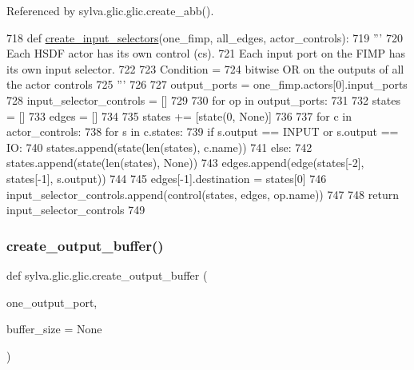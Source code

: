 Referenced by sylva.\+glic.\+glic.\+create\+\_\+abb().


\begin{DoxyCode}
718   \textcolor{keyword}{def }\hyperlink{namespacesylva_1_1glic_1_1glic_a28f028a55874a8d890d0df58905da73b}{create\_input\_selectors}(one\_fimp, all\_edges, actor\_controls):
719     \textcolor{stringliteral}{'''}
720 \textcolor{stringliteral}{      Each HSDF actor has its own control (cs).}
721 \textcolor{stringliteral}{      Each input port on the FIMP has its own input selector.}
722 \textcolor{stringliteral}{}
723 \textcolor{stringliteral}{      Condition =}
724 \textcolor{stringliteral}{        bitwise OR on the outputs of all the actor controls}
725 \textcolor{stringliteral}{    '''}
726 
727     output\_ports = one\_fimp.actors[0].input\_ports
728     input\_selector\_controls = []
729 
730     \textcolor{keywordflow}{for} op \textcolor{keywordflow}{in} output\_ports:
731 
732       states = []
733       edges = []
734 
735       states += [state(0, \textcolor{keywordtype}{None})]
736 
737       \textcolor{keywordflow}{for} c \textcolor{keywordflow}{in} actor\_controls:
738         \textcolor{keywordflow}{for} s \textcolor{keywordflow}{in} c.states:
739           \textcolor{keywordflow}{if} s.output == INPUT \textcolor{keywordflow}{or} s.output == IO:
740             states.append(state(len(states), c.name))
741           \textcolor{keywordflow}{else}:
742             states.append(state(len(states), \textcolor{keywordtype}{None}))
743           edges.append(edge(states[-2], states[-1], s.output))
744 
745       edges[-1].destination = states[0]
746       input\_selector\_controls.append(control(states, edges, op.name))
747 
748     \textcolor{keywordflow}{return} input\_selector\_controls
749 
\end{DoxyCode}
\mbox{\label{namespacesylva_1_1glic_1_1glic_a414741c04de0838d506dbeee050368a6}} 
\subsubsection{\texorpdfstring{create\+\_\+output\+\_\+buffer()}{create\_output\_buffer()}}
{\footnotesize\ttfamily def sylva.\+glic.\+glic.\+create\+\_\+output\+\_\+buffer (\begin{DoxyParamCaption}\item[{}]{one\+\_\+output\+\_\+port,  }\item[{}]{buffer\+\_\+size = {\ttfamily None} }\end{DoxyParamCaption})}

